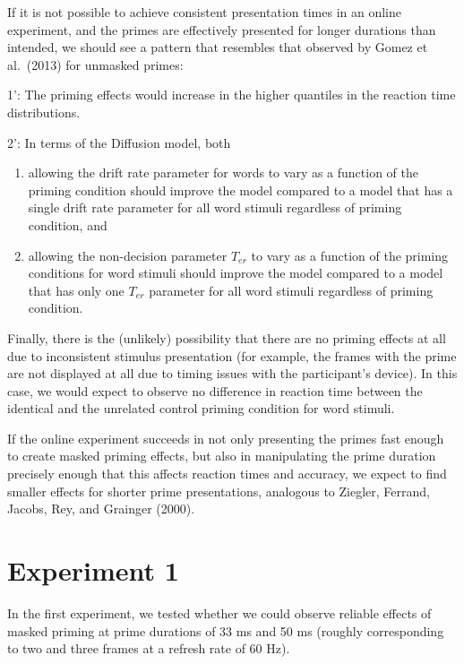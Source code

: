 \documentclass[
  english,
  man]{apa6}
\begin{document}
If it is not possible to achieve consistent presentation times in an online experiment, and the primes are effectively presented for longer durations than intended, we should see a pattern that resembles that observed by Gomez et al.~(2013) for unmasked primes:

1': The priming effects would increase in the higher quantiles in the reaction time distributions.

2': In terms of the Diffusion model, both

\begin{enumerate}
\def\labelenumi{\alph{enumi})}
\item
  allowing the drift rate parameter for words to vary as a function of the priming condition should improve the model compared to a model that has a single drift rate parameter for all word stimuli regardless of priming condition, and
\item
  allowing the non-decision parameter \(T_{er}\) to vary as a function of the priming conditions for word stimuli should improve the model compared to a model that has only one \(T_{er}\) parameter for all word stimuli regardless of priming condition.
\end{enumerate}

Finally, there is the (unlikely) possibility that there are no priming effects at all due to inconsistent stimulus presentation (for example, the frames with the prime are not displayed at all due to timing issues with the participant's device). In this case, we would expect to observe no difference in reaction time between the identical and the unrelated control priming condition for word stimuli.

If the online experiment succeeds in not only presenting the primes fast enough to create masked priming effects, but also in manipulating the prime duration precisely enough that this affects reaction times and accuracy, we expect to find smaller effects for shorter prime presentations, analogous to Ziegler, Ferrand, Jacobs, Rey, and Grainger (2000).

\hypertarget{experiment-1}{%
\section{Experiment 1}\label{experiment-1}}

In the first experiment, we tested whether we could observe reliable effects of masked priming at prime durations of 33 ms and 50 ms (roughly corresponding to two and three frames at a refresh rate of 60 Hz).
\end{document}
